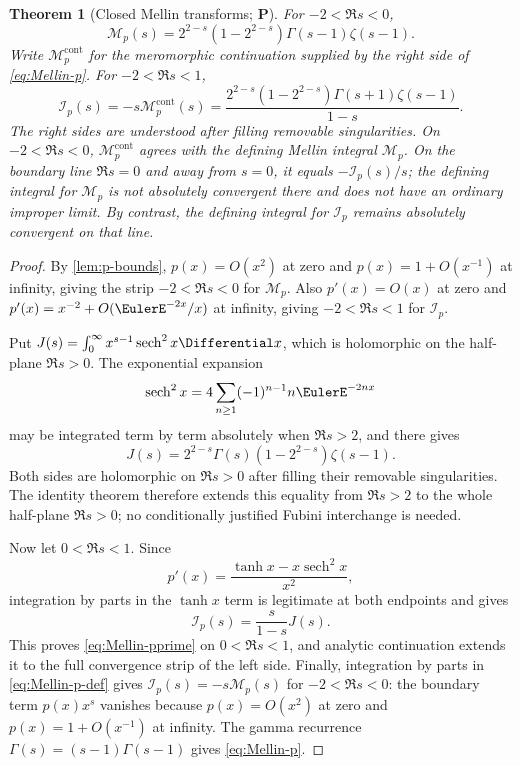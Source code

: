 \documentclass[11pt,oneside]{article}
\newtheorem{theorem}{Theorem}[section]
\theoremstyle{definition}
\theoremstyle{remark}
\newcommand{\sech}{\operatorname{sech}}
\newcommand{\Ical}{\mathcal I}
\newcommand{\Mcal}{\mathcal M}
\newcommand{\statusP}{\textcolor{deepgreen}{\textbf{P}}}
\begin{document}
\begin{theorem}[Closed Mellin transforms; \statusP]
\label{thm:Mellin-p}
For $-2<\Re s<0$,
\begin{equation}
 \boxed{
 \Mcal_p(s)=
 2^{2-s}(1-2^{2-s})\Gamma(s-1)\zeta(s-1).}
 \label{eq:Mellin-p}
\end{equation}
Write $\Mcal_p^{\mathrm{cont}}$ for the meromorphic continuation supplied by
the right side of \eqref{eq:Mellin-p}.  For $-2<\Re s<1$,
\begin{equation}
 \boxed{
 \Ical_p(s)=-s\Mcal_p^{\mathrm{cont}}(s)
 =\frac{2^{2-s}(1-2^{2-s})\Gamma(s+1)\zeta(s-1)}{1-s}.}
 \label{eq:Mellin-pprime}
\end{equation}
The right sides are understood after filling removable singularities.
On $-2<\Re s<0$, $\Mcal_p^{\mathrm{cont}}$ agrees with the defining Mellin
integral $\Mcal_p$.  On the boundary line $\Re s=0$ and away from $s=0$, it
equals $-\Ical_p(s)/s$; the defining integral for $\Mcal_p$ is not absolutely
convergent there and does not have an ordinary improper limit.  By contrast,
the defining integral for $\Ical_p$ remains absolutely convergent on that
line.
\end{theorem}

\begin{proof}
By \cref{lem:p-bounds}, $p(x)=O(x^2)$ at zero and $p(x)=1+O(x^{-1})$ at
infinity, giving the strip $-2<\Re s<0$ for $\Mcal_p$.  Also
$p'(x)=O(x)$ at zero and $p'(x)=x^{-2}+O(\EulerE^{-2x}/x)$ at infinity, giving
$-2<\Re s<1$ for $\Ical_p$.

Put
$J(s)=\int_0^\infty x^{s-1}\sech^2x\Differential x$, which is holomorphic on the
half-plane $\Re s>0$.  The exponential expansion
\[
 \sech^2x=4\sum_{n\ge1}(-1)^{n-1}n\EulerE^{-2nx}
\]
may be integrated term by term absolutely when $\Re s>2$, and there gives
\[
 J(s)=2^{2-s}\Gamma(s)(1-2^{2-s})\zeta(s-1).
\]
Both sides are holomorphic on $\Re s>0$ after filling their removable
singularities.  The identity theorem therefore extends this equality from
$\Re s>2$ to the whole half-plane $\Re s>0$; no conditionally justified
Fubini interchange is needed.

Now let $0<\Re s<1$.  Since
\[
 p'(x)=\frac{\tanh x-x\sech^2x}{x^2},
\]
integration by parts in the $\tanh x$ term is legitimate at both endpoints
and gives
\[
 \Ical_p(s)=\frac{s}{1-s}J(s).
\]
This proves \eqref{eq:Mellin-pprime} on $0<\Re s<1$, and analytic
continuation extends it to the full convergence strip of the left side.
Finally, integration by parts in \eqref{eq:Mellin-p-def} gives
$\Ical_p(s)=-s\Mcal_p(s)$ for $-2<\Re s<0$: the boundary term
$p(x)x^s$ vanishes because $p(x)=O(x^2)$ at zero and $p(x)=1+O(x^{-1})$ at
infinity.  The gamma recurrence
$\Gamma(s)=(s-1)\Gamma(s-1)$ gives \eqref{eq:Mellin-p}.
\end{proof}
\end{document}
